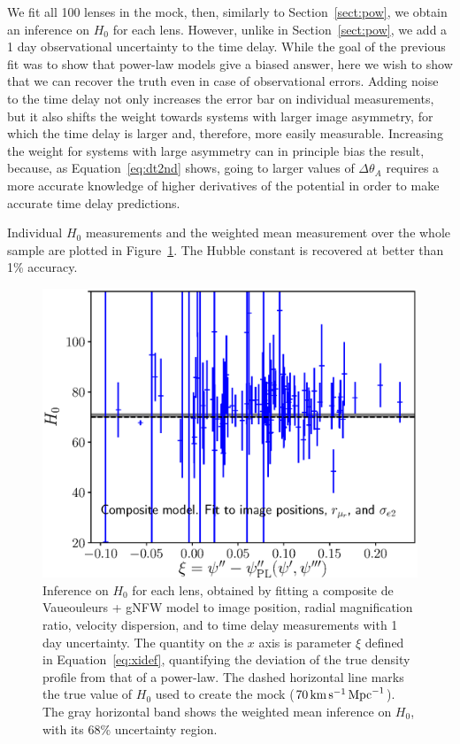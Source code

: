 \documentclass[usenatbib]{mnras}
\def\Sref#1{Section~\ref{#1}\xspace}
\def\Fref#1{Figure~\ref{#1}\xspace}
\def\Eref#1{Equation~\ref{#1}\xspace}
\begin{document}
We fit all 100 lenses in the mock, then, similarly to \Sref{sect:pow}, we obtain an inference on $H_0$ for each lens.
However, unlike in \Sref{sect:pow}, we add a 1 day observational uncertainty to the time delay.
While the goal of the previous fit was to show that power-law models give a biased answer, here we wish to show that we can recover the truth even in case of observational errors.
Adding noise to the time delay not only increases the error bar on individual measurements, but it also shifts the weight towards systems with larger image asymmetry, for which the time delay is larger and, therefore, more easily measurable.
Increasing the weight for systems with large asymmetry can in principle bias the result, because, as \Eref{eq:dt2nd} shows, going to larger values of $\Delta\theta_A$ requires a more accurate knowledge of higher derivatives of the potential in order to make accurate time delay predictions.

Individual $H_0$ measurements and the weighted mean measurement over the whole sample are plotted in \Fref{fig:gnfw_indH0}.
The Hubble constant is recovered at better than 1\% accuracy.
%
\begin{figure}
 \includegraphics[width=\columnwidth]{gnfw_individual_H0.eps}
 \caption{Inference on $H_0$ for each lens, obtained by fitting a composite de Vaueouleurs + gNFW model to image position, radial magnification ratio, velocity dispersion, and to time delay measurements with 1 day uncertainty.
The quantity on the $x$ axis is parameter $\xi$ defined in \Eref{eq:xidef}, quantifying the deviation of the true density profile from that of a power-law.
The dashed horizontal line marks the true value of $H_0$ used to create the mock ($70\,\rm{km}\,\rm{s}^{-1}\,\rm{Mpc}^{-1}$).
The gray horizontal band shows the weighted mean inference on $H_0$, with its 68\% uncertainty region.
}
 \label{fig:gnfw_indH0}
\end{figure}
%
\end{document}
